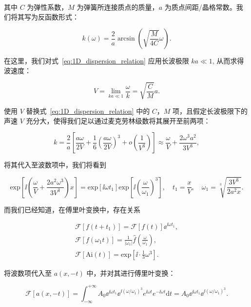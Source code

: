 其中 $C$ 为弹性系数，$M$ 为弹簧所连接质点的质量，$a$ 为质点间距/晶格常数。我们将其写为反函数形式：

\begin{equation}
  k(\omega) = \frac{2}{a}\arcsin{\left(\sqrt{\frac{M}{4C}}\omega\right)}.\label{eq:1D_dispersion_relation}
\end{equation}

在这里，我们对式~\eqref{eq:1D_dispersion_relation} 应用长波极限 $ka\ll 1$, 从而求得波速度：

\begin{equation}
  V = \lim_{ka\ll 1}\frac{\omega}{k} = \sqrt{\frac{C}{M}}a.
\end{equation}

使用 $V$ 替换式~\eqref{eq:1D_dispersion_relation} 中的 $C$，$M$ 项，且假定长波极限下的声速 $V$ 充分大，使得我们足以通过麦克劳林级数将其展开至前两项：

\begin{equation}
  k = \frac{2}{a}\left[\frac{a\omega}{2V} + \frac{1}{6}\left(\frac{a\omega}{2V}\right)^{3} + o\left(\frac{1}{V^3}\right)\right]\approx\frac{\omega}{V} + \frac{2\omega^{3}a^{2}}{3V^{3}},
\end{equation}

将其代入至波数项中，我们将看到

\begin{equation}
  \text{exp}\left[{\ii \left(\frac{\omega}{V} + \frac{2a^{2}\omega^{3}}{3V^{3}}\right)x}\right] = \text{exp}[{\ii\omega t_{1}}]\text{exp}\left[{\ii\left(\frac{\omega}{\omega_{1}}\right)^{3}}\right],\quad t_{1} = \frac{x}{V},\quad \omega_{1} = \sqrt[3]{\frac{3V^{3}}{2a^{2}x}}.\label{eq:rescale_method}
\end{equation}

而我们已经知道，在傅里叶变换中，存在关系

\begin{align}
  \mathcal{F}[f(t+t_{1})] = \mathcal{F}[f(t)]{\ee}^{\ii\omega t_{1}},\label{eq:translation_property}\\
  \mathcal{F}[f(\omega_{1}t)] = \frac{1}{|\omega_{1}|}\hat{f}\left(\frac{\omega}{\omega_{1}}\right),\label{eq:scale_property}\\
  \mathcal{F}[\text{Ai}(t)] = \text{exp}\left[\ii\cdot \frac{1}{3}\omega^3\right].
\end{align}

将波数项代入至 $a(x,-t)$ 中，并对其进行傅里叶变换：

\begin{equation}
  \mathcal{F}[a(x,-t)] = \int_{-\infty}^{+\infty}A_{0}{\ee}^{\ii\omega t_{1}}{\ee}^{\ii(\omega/\omega_{1})^{3}}e^{\ii\omega t}e^{-\ii\omega t}\mathrm{d}t = A_{0}{\ee}^{\ii\omega t_{1}}{\ee}^{\ii(\omega/\omega_{1})^{3}}.
\end{equation}

